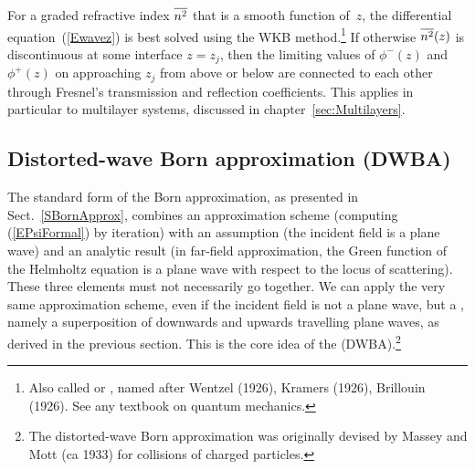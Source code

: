For a graded refractive index
%
$\overline{n^2}$ that is a smooth function of~$z$,
the differential equation~(\ref{Ewavez}) is best solved
using the WKB method.\footnote
{Also called  or
,
named after Wentzel (1926), Kramers (1926), Brillouin (1926).
See any textbook on quantum mechanics.}
%
%
%
If otherwise $\overline{n^2}(z)$ is discontinuous at some interface $z=z_j$,
then the limiting values of $\phi^-(z)$ and $\phi^+(z)$
on approaching $z_j$ from above or below
are connected to each other through Fresnel's
transmission and reflection coefficients.
%
This applies in particular to multilayer systems,
discussed in chapter~\ref{sec:Multilayers}.

\subsection{Distorted-wave Born approximation (DWBA)}\label{SDWBA}

%
%

The standard form of the Born approximation,
as presented in Sect.~\ref{SBornApprox},
combines an approximation scheme
(computing (\ref{EPsiFormal}) by iteration)
with an assumption (the incident field is a plane wave)
and an analytic result
(in far-field approximation,
the Green function of the Helmholtz equation is a plane wave
with respect to the locus of scattering).
These three elements must not necessarily go together.
We can apply the very same approximation scheme,
even if the incident field is not a plane wave,
but a ,
namely a superposition of downwards and upwards travelling plane waves,
as derived in the previous section.
This is the core idea
of the  (DWBA).\footnote
{The distorted-wave Born approximation
was originally devised by Massey and Mott (ca 1933)
for collisions of charged particles.}

